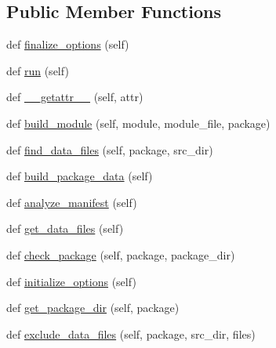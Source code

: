 \subsection*{Public Member Functions}
\begin{DoxyCompactItemize}
\item 
def \hyperlink{classsetuptools_1_1command_1_1build__py_1_1build__py_a41b0f083dd32d4c66b613351effac975}{finalize\+\_\+options} (self)
\item 
def \hyperlink{classsetuptools_1_1command_1_1build__py_1_1build__py_a9d6ec30f78533d2d06db30903b5ffbc1}{run} (self)
\item 
def \hyperlink{classsetuptools_1_1command_1_1build__py_1_1build__py_a2403cb67b7dea463615bcdafa21f14c3}{\+\_\+\+\_\+getattr\+\_\+\+\_\+} (self, attr)
\item 
def \hyperlink{classsetuptools_1_1command_1_1build__py_1_1build__py_a14bbd6329de06c247a7934416d5a6ce9}{build\+\_\+module} (self, module, module\+\_\+file, package)
\item 
def \hyperlink{classsetuptools_1_1command_1_1build__py_1_1build__py_a1bea08ff0074a9909bf9cdd649cfaa08}{find\+\_\+data\+\_\+files} (self, package, src\+\_\+dir)
\item 
def \hyperlink{classsetuptools_1_1command_1_1build__py_1_1build__py_abada4e4302bf4dbdabc9b64e63f87924}{build\+\_\+package\+\_\+data} (self)
\item 
def \hyperlink{classsetuptools_1_1command_1_1build__py_1_1build__py_a55dcdddb2d785198bcca45dc83494740}{analyze\+\_\+manifest} (self)
\item 
def \hyperlink{classsetuptools_1_1command_1_1build__py_1_1build__py_a896019b7df2c118164543c52ebbc822a}{get\+\_\+data\+\_\+files} (self)
\item 
def \hyperlink{classsetuptools_1_1command_1_1build__py_1_1build__py_a413157c1d6b7d6a686b410c801a4863f}{check\+\_\+package} (self, package, package\+\_\+dir)
\item 
def \hyperlink{classsetuptools_1_1command_1_1build__py_1_1build__py_ac1dedf42c24e46f783273379898dfc0c}{initialize\+\_\+options} (self)
\item 
def \hyperlink{classsetuptools_1_1command_1_1build__py_1_1build__py_a4ecdae078542d60a4132c9a8fcbd3349}{get\+\_\+package\+\_\+dir} (self, package)
\item 
def \hyperlink{classsetuptools_1_1command_1_1build__py_1_1build__py_a96c9d4d9ff336e71dd5d6076ae216589}{exclude\+\_\+data\+\_\+files} (self, package, src\+\_\+dir, files)
\end{DoxyCompactItemize}
